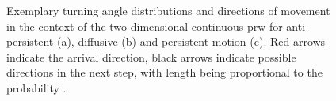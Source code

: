 \begin{figure}[bth]
    \myfloatalign
     \quad
     \quad
    \caption[Turning angle distributions in the 2D \acl{prw}]{Exemplary turning angle distributions and directions of movement in the context of the two-dimensional continuous \ac{prw} for anti-persistent (a), diffusive (b) and persistent motion (c). Red arrows indicate the arrival direction, black arrows indicate possible directions in the next step, with length being proportional to the probability \cite{shaebani:2014}.}\label{fig:PRWTurningAngleDistribution}
\end{figure}

